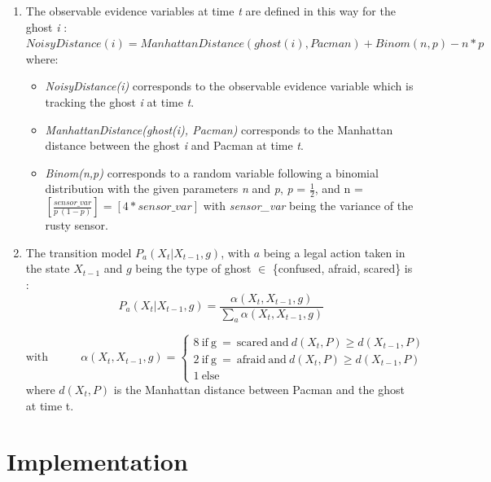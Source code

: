 \documentclass{article}
\newcommand\round[1]{\left[#1\right]}
\begin{document}
\begin{enumerate}[label=\alph*.,leftmargin=*]
    \item The observable evidence variables at time \textit{t} are defined in
    this way for the ghost \textit{i} : \\
    
    $NoisyDistance(i) = 
    ManhattanDistance(ghost(i), Pacman) + Binom(n, p) - n * p$ \\

    where:
    \begin{itemize}
    	\item \textit{NoisyDistance(i)} corresponds to the observable evidence variable 
    which is tracking the ghost \textit{i} at time \textit{t}.
    	\item \textit{ManhattanDistance(ghost(i), Pacman)} corresponds to the Manhattan distance between the ghost \textit{i} and Pacman at time \textit{t}.
    	\item \textit{Binom(n,p)} corresponds to a random variable following a binomial distribution with the given parameters
    \textit{n} and \textit{p}, \textit{p} = $\frac{1}{2}$, and n = $\round{\frac{sensor\_var}{p \ (1 - p)}} = \round{4 * sensor\_var}$ with \textit{sensor\_var} being the variance of the rusty sensor.
    \end{itemize}
    
    \item The transition model $P_a(X_t | X_{t-1}, g)$, with $a$ being a legal action taken in the state $X_{t-1}$ and $g$ being the type of ghost $\in$ \{confused, afraid, scared\} is :
    \[
  P_a(X_t | X_{t-1}, g) = \frac{\alpha(X_t, X_{t-1}, g)}{{\sum_{a} {\alpha(X_t, X_{t-1}, g)}}}
\]

\[
\text{with} \ \ \ \ \ \ \ \ \ \ \ \ \ \alpha(X_t, X_{t-1}, g) = 
  \begin{cases}
        \text{8} \ \text{if} \ \text{g} \ = \ \text{scared} \ \text{and} \ d(X_t, P)  \geq  d(X_{t-1}, P)\\
        \text{2} \ \text{if} \ \text{g} \ = \ \text{afraid} \ \text{and} \ d(X_t, P)  \geq  d(X_{t-1}, P)\\
        \text{1} \ \text{else}
  \end{cases}
\]
where $d(X_t, P)$ is the Manhattan distance between Pacman and the ghost at time t.
	

\end{enumerate}

\section{Implementation}
\end{document}

